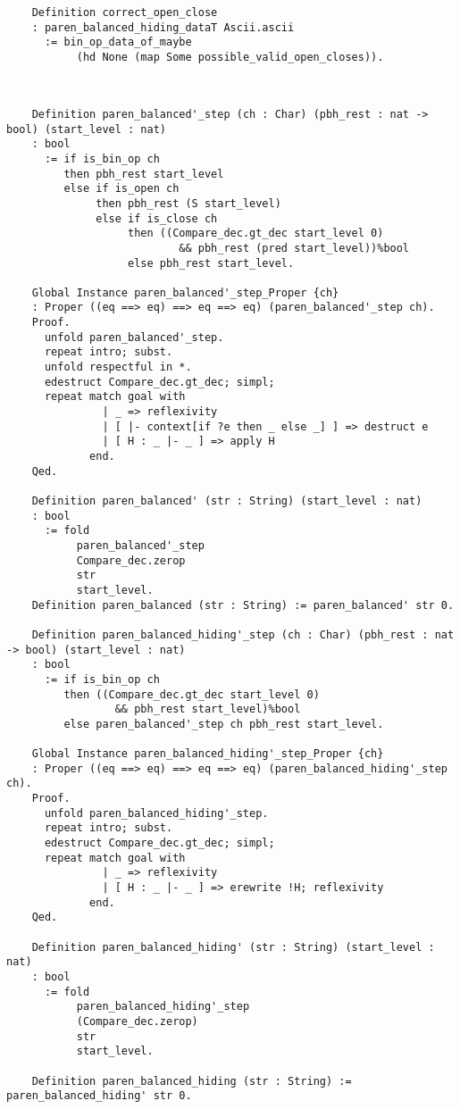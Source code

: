 \begin{verbatim}
    Definition correct_open_close
    : paren_balanced_hiding_dataT Ascii.ascii
      := bin_op_data_of_maybe
           (hd None (map Some possible_valid_open_closes)).



\end{verbatim}

\begin{verbatim}
    Definition paren_balanced'_step (ch : Char) (pbh_rest : nat -> bool) (start_level : nat)
    : bool
      := if is_bin_op ch
         then pbh_rest start_level
         else if is_open ch
              then pbh_rest (S start_level)
              else if is_close ch
                   then ((Compare_dec.gt_dec start_level 0)
                           && pbh_rest (pred start_level))%bool
                   else pbh_rest start_level.

    Global Instance paren_balanced'_step_Proper {ch}
    : Proper ((eq ==> eq) ==> eq ==> eq) (paren_balanced'_step ch).
    Proof.
      unfold paren_balanced'_step.
      repeat intro; subst.
      unfold respectful in *.
      edestruct Compare_dec.gt_dec; simpl;
      repeat match goal with
               | _ => reflexivity
               | [ |- context[if ?e then _ else _] ] => destruct e
               | [ H : _ |- _ ] => apply H
             end.
    Qed.

    Definition paren_balanced' (str : String) (start_level : nat)
    : bool
      := fold
           paren_balanced'_step
           Compare_dec.zerop
           str
           start_level.
    Definition paren_balanced (str : String) := paren_balanced' str 0.

    Definition paren_balanced_hiding'_step (ch : Char) (pbh_rest : nat -> bool) (start_level : nat)
    : bool
      := if is_bin_op ch
         then ((Compare_dec.gt_dec start_level 0)
                 && pbh_rest start_level)%bool
         else paren_balanced'_step ch pbh_rest start_level.

    Global Instance paren_balanced_hiding'_step_Proper {ch}
    : Proper ((eq ==> eq) ==> eq ==> eq) (paren_balanced_hiding'_step ch).
    Proof.
      unfold paren_balanced_hiding'_step.
      repeat intro; subst.
      edestruct Compare_dec.gt_dec; simpl;
      repeat match goal with
               | _ => reflexivity
               | [ H : _ |- _ ] => erewrite !H; reflexivity
             end.
    Qed.

    Definition paren_balanced_hiding' (str : String) (start_level : nat)
    : bool
      := fold
           paren_balanced_hiding'_step
           (Compare_dec.zerop)
           str
           start_level.

    Definition paren_balanced_hiding (str : String) := paren_balanced_hiding' str 0.

\end{verbatim}

